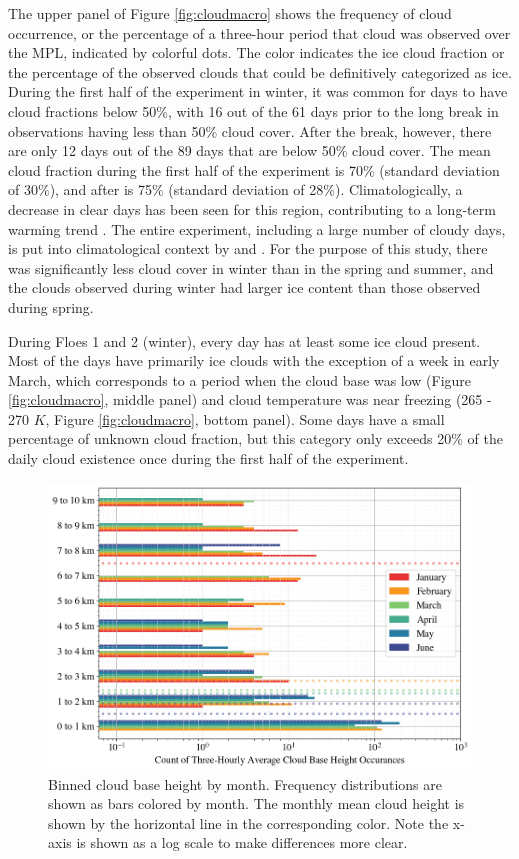 The upper panel of Figure \ref{fig:cloudmacro} shows the frequency of cloud occurrence, or the percentage of a three-hour period that cloud was observed over the MPL, indicated by colorful dots. The color indicates the ice cloud fraction or the percentage of the observed clouds that could be definitively categorized as ice. During the first half of the experiment in winter, it was common for days to have cloud fractions below 50$\%$, with 16 out of the 61 days prior to the long break in observations having less than 50$\%$ cloud cover. After the break, however, there are only 12 days out of the 89 days that are below 50$\%$ cloud cover. The mean cloud fraction during the first half of the experiment is 70$\%$ (standard deviation of 30$\%$), and after is 75$\%$ (standard deviation of 28$\%$). Climatologically, a decrease in clear days has been seen for this region, contributing to a long-term warming trend \citep{kayser:2017}. The entire experiment, including a large number of cloudy days, is put into climatological context by \citet{graham:2017} and \citet{kayser:2017}. For the purpose of this study, there was significantly less cloud cover in winter than in the spring and summer, and the clouds observed during winter had larger ice content than those observed during spring.

During Floes 1 and 2 (winter), every day has at least some ice cloud present. Most of the days have primarily ice clouds with the exception of a week in early March, which corresponds to a period when the cloud base was low (Figure \ref{fig:cloudmacro}, middle panel) and cloud temperature was near freezing (265 - 270 $K$, Figure \ref{fig:cloudmacro}, bottom panel). Some days have a small percentage of unknown cloud fraction, but this category only exceeds 20$\%$ of the daily cloud existence once during the first half of the experiment. 

\begin{figure}[b!]
    \centering
    \includegraphics[width=1\linewidth]{figures/chapter4/CloudHeights.png}
    \caption[Cloud base height by month histogram.]{Binned cloud base height by month. Frequency distributions are shown as bars colored by month. The monthly mean cloud height is shown by the horizontal line in the corresponding color. Note the x-axis is shown as a log scale to make differences more clear.}
    \label{fig:cloudbase}
\end{figure}

